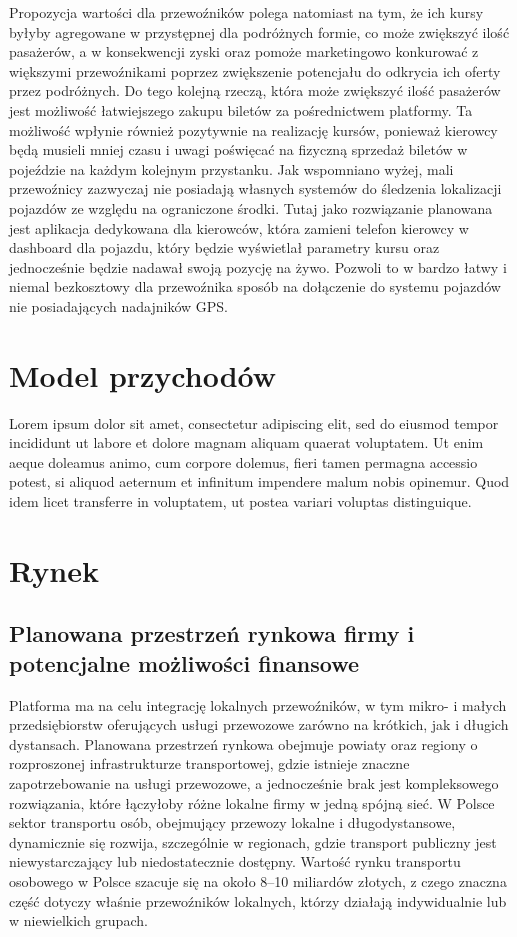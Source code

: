 Propozycja wartości dla przewoźników polega natomiast na tym, że ich kursy byłyby agregowane w przystępnej dla podróżnych formie, co może zwiększyć ilość pasażerów, a w konsekwencji zyski oraz pomoże marketingowo konkurować z większymi przewoźnikami poprzez zwiększenie potencjału do odkrycia ich oferty przez podróżnych. Do tego kolejną rzeczą, która może zwiększyć ilość pasażerów jest możliwość łatwiejszego zakupu biletów za pośrednictwem platformy. Ta możliwość wpłynie również pozytywnie na realizację kursów, ponieważ kierowcy będą musieli mniej czasu i uwagi poświęcać na fizyczną sprzedaż biletów w pojeździe na każdym kolejnym przystanku. Jak wspomniano wyżej, mali przewoźnicy zazwyczaj nie posiadają własnych systemów do śledzenia lokalizacji pojazdów ze względu na ograniczone środki. Tutaj jako rozwiązanie planowana jest aplikacja dedykowana dla kierowców, która zamieni telefon kierowcy w dashboard dla pojazdu, który będzie wyświetlał parametry kursu oraz jednocześnie będzie nadawał swoją pozycję na żywo. Pozwoli to w bardzo łatwy i niemal bezkosztowy dla przewoźnika sposób na dołączenie do systemu pojazdów nie posiadających nadajników GPS.

\section{Model przychodów}

Lorem ipsum dolor sit amet, consectetur adipiscing elit, sed do eiusmod tempor incididunt ut labore et dolore magnam aliquam quaerat voluptatem. Ut enim aeque doleamus animo, cum corpore dolemus, fieri tamen permagna accessio potest, si aliquod aeternum et infinitum impendere malum nobis opinemur. Quod idem licet transferre in voluptatem, ut postea variari voluptas distinguique.

\section{Rynek}
\subsection{Planowana przestrzeń rynkowa firmy i potencjalne możliwości finansowe}
Platforma ma na celu integrację lokalnych przewoźników, w tym mikro- i małych przedsiębiorstw oferujących usługi przewozowe zarówno na krótkich, jak i długich dystansach. Planowana przestrzeń rynkowa obejmuje powiaty oraz regiony o rozproszonej infrastrukturze transportowej, gdzie istnieje znaczne zapotrzebowanie na usługi przewozowe, a jednocześnie brak jest kompleksowego rozwiązania, które łączyłoby różne lokalne firmy w jedną spójną sieć.
W Polsce sektor transportu osób, obejmujący przewozy lokalne i długodystansowe, dynamicznie się rozwija, szczególnie w regionach, gdzie transport publiczny jest niewystarczający lub niedostatecznie dostępny. Wartość rynku transportu osobowego w Polsce szacuje się na około 8–10 miliardów złotych, z czego znaczna część dotyczy właśnie przewoźników lokalnych, którzy działają indywidualnie lub w niewielkich grupach.

